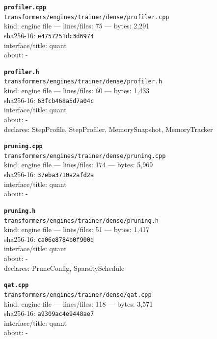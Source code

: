 \noindent\textbf{\texttt{profiler.cpp}}\\
\texttt{transformers/engines/trainer/dense/profiler.cpp}\\
kind: engine file --- lines/files: 75 --- bytes: 2,291\\
sha256-16: \texttt{e4757251dc3d6974}\\
interface/title: quant\\
about: -\\
\vspace*{6.0pt}

\noindent\textbf{\texttt{profiler.h}}\\
\texttt{transformers/engines/trainer/dense/profiler.h}\\
kind: engine file --- lines/files: 60 --- bytes: 1,433\\
sha256-16: \texttt{63fcb468a5d7a04c}\\
interface/title: quant\\
about: -\\
declares: StepProfile, StepProfiler, MemorySnapshot, MemoryTracker\\
\vspace*{6.0pt}

\noindent\textbf{\texttt{pruning.cpp}}\\
\texttt{transformers/engines/trainer/dense/pruning.cpp}\\
kind: engine file --- lines/files: 174 --- bytes: 5,969\\
sha256-16: \texttt{37eba3710a2afd2a}\\
interface/title: quant\\
about: -\\
\vspace*{6.0pt}

\noindent\textbf{\texttt{pruning.h}}\\
\texttt{transformers/engines/trainer/dense/pruning.h}\\
kind: engine file --- lines/files: 51 --- bytes: 1,417\\
sha256-16: \texttt{ca06e8784b0f900d}\\
interface/title: quant\\
about: -\\
declares: PruneConfig, SparsitySchedule\\
\vspace*{6.0pt}
\newpage

\noindent\textbf{\texttt{qat.cpp}}\\
\texttt{transformers/engines/trainer/dense/qat.cpp}\\
kind: engine file --- lines/files: 118 --- bytes: 3,571\\
sha256-16: \texttt{a9309ac4e9448ae7}\\
interface/title: quant\\
about: -\\
\vspace*{6.0pt}

